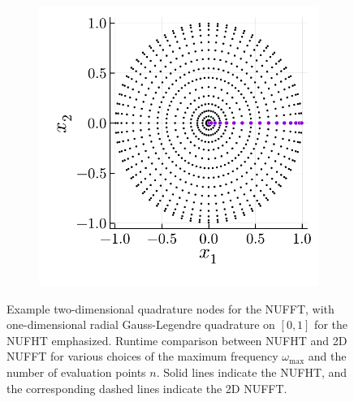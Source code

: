 \begin{figure}
  \centering
  \begin{subfigure}[b]{0.38\textwidth}
    \includegraphics[height=\textwidth]{./figures/quadrature_2D.pdf}
  \end{subfigure}
  \begin{subfigure}[b]{0.60\textwidth}
  \end{subfigure}
  \caption{Example two-dimensional quadrature nodes for the NUFFT, with
  one-dimensional radial Gauss-Legendre quadrature on $[0,1]$ for the NUFHT
  emphasized. Runtime comparison between NUFHT and 2D NUFFT for various choices
  of the maximum frequency $\omega_{\text{max}}$ and the number of  evaluation
  points $n$. Solid lines indicate the NUFHT, and the corresponding dashed lines
  indicate the 2D NUFFT.}
  \label{fig:fourier-test}
\end{figure}

